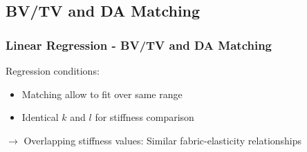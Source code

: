 \documentclass[xcolor=table,11pt]{beamer}
\begin{document}

\subsection{BV/TV and DA Matching}

\begin{frame}
	\frametitle{Linear Regression - BV/TV and DA Matching}
	
	Regression conditions:
	\begin{itemize}
		\item Matching allow to fit over same range
		\item Identical $k$ and $l$ for stiffness comparison
	\end{itemize}

	\vfill

	\begin{table}[]
		\centering
		\caption{Summary of BV/TV and DA matched data set linear regression\vspace{-1em}}
		\label{Table3}
	\end{table}

	\vfill
	
	$\rightarrow$ Overlapping stiffness values: Similar fabric-elasticity relationships
\end{frame}
\end{document}
